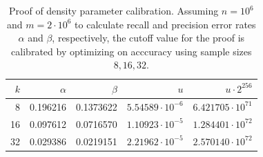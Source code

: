 \begin{table}[!ht]
 \centering
  \begin{tabular}{rrrrr}
  \toprule
  $k$ & $\alpha$ & $\beta$ & $u$ & $u \cdot 2^{256}$ \\
  \midrule
  8 & 0.196216 & 0.1373622 & $5.54589\cdot 10^{-6}$ & $6.421705\cdot 10^{71}$\\
  16 & 0.097612 & 0.0716570 & $1.10923\cdot 10^{-5}$ & $1.284401\cdot 10^{72}$\\
  32 & 0.029386 & 0.0219151 & $2.21962\cdot 10^{-5}$ & $2.570140\cdot 10^{72}$\\
  \bottomrule
  \end{tabular}
   \caption[Proof of density parameter calibration]{Proof of density parameter calibration. Assuming $n = 10^6$ and $m=2\cdot 10^6$ to calculate recall and precision error rates $\alpha$ and $\beta$, respectively, the cutoff value for the proof is calibrated by optimizing on acccuracy using sample sizes $8, 16, 32$.}
  \label{tab:estim}
\end{table}
